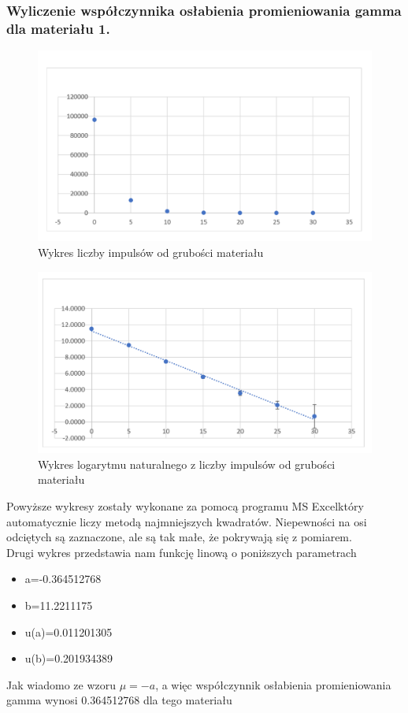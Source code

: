 \documentclass{article}
\begin{document}
\subsubsection{Wyliczenie współczynnika osłabienia promieniowania gamma dla materiału 1.}
\begin{figure}[h!]
    \centering
    \includegraphics[scale=0.55]{1.1.png}
    \caption{Wykres liczby impulsów od grubości materiału}
\end{figure}
\begin{figure}[h!]
    \centering
    \includegraphics[scale=0.55]{1.2.png}
        \caption{Wykres logarytmu naturalnego z liczby impulsów od grubości materiału}
\end{figure}
\clearpage
\noindent Powyższe wykresy zostały wykonane za pomocą programu MS Excelktóry automatycznie liczy metodą najmniejszych kwadratów. Niepewności na osi odciętych są zaznaczone, ale są tak małe, że pokrywają się z pomiarem.\\
Drugi wykres przedstawia nam funkcję linową o poniższych parametrach
\begin{itemize}
    \item a=-0.364512768
    \item b=11.2211175
    \item u(a)=0.011201305
    \item u(b)=0.201934389
\end{itemize}
Jak wiadomo ze wzoru $\mu = -a $, a więc współczynnik osłabienia promieniowania gamma wynosi 0.364512768  dla tego materiału
\clearpage
\end{document}
